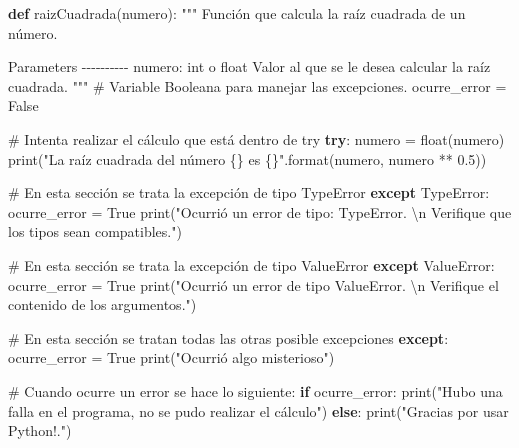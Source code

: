 \documentclass[
  spanish,
  letterpaper,
]{scrbook}
\newenvironment{Shaded}{\begin{snugshade}}{\end{snugshade}}
\newcommand{\BuiltInTok}[1]{\textcolor[rgb]{0.00,0.23,0.31}{#1}}
\newcommand{\CharTok}[1]{\textcolor[rgb]{0.13,0.47,0.30}{#1}}
\newcommand{\CommentTok}[1]{\textcolor[rgb]{0.37,0.37,0.37}{#1}}
\newcommand{\ControlFlowTok}[1]{\textcolor[rgb]{0.00,0.23,0.31}{\textbf{#1}}}
\newcommand{\FloatTok}[1]{\textcolor[rgb]{0.68,0.00,0.00}{#1}}
\newcommand{\KeywordTok}[1]{\textcolor[rgb]{0.00,0.23,0.31}{\textbf{#1}}}
\newcommand{\NormalTok}[1]{\textcolor[rgb]{0.00,0.23,0.31}{#1}}
\newcommand{\OperatorTok}[1]{\textcolor[rgb]{0.37,0.37,0.37}{#1}}
\newcommand{\PreprocessorTok}[1]{\textcolor[rgb]{0.68,0.00,0.00}{#1}}
\newcommand{\SpecialCharTok}[1]{\textcolor[rgb]{0.37,0.37,0.37}{#1}}
\newcommand{\StringTok}[1]{\textcolor[rgb]{0.13,0.47,0.30}{#1}}
\newcommand{\VariableTok}[1]{\textcolor[rgb]{0.07,0.07,0.07}{#1}}
\theoremstyle{definition}
\theoremstyle{remark}
\begin{document}
\begin{Shaded}
\begin{Highlighting}[]
\KeywordTok{def}\NormalTok{ raizCuadrada(numero):}
    \CommentTok{"""}
\CommentTok{    Función que calcula la raíz cuadrada de un número.}

\CommentTok{    Parameters}
\CommentTok{    {-}{-}{-}{-}{-}{-}{-}{-}{-}{-}}
\CommentTok{    numero: int o float}
\CommentTok{        Valor al que se le desea calcular la raíz cuadrada.}
\CommentTok{    }
\CommentTok{    """}
    \CommentTok{\# Variable Booleana para manejar las excepciones.}
\NormalTok{    ocurre\_error }\OperatorTok{=} \VariableTok{False}
    
    \CommentTok{\# Intenta realizar el cálculo que está dentro de try}
    \ControlFlowTok{try}\NormalTok{:}
\NormalTok{        numero }\OperatorTok{=} \BuiltInTok{float}\NormalTok{(numero)}
        \BuiltInTok{print}\NormalTok{(}\StringTok{"La raíz cuadrada del número }\SpecialCharTok{\{\}}\StringTok{ es }\SpecialCharTok{\{\}}\StringTok{"}\NormalTok{.}\BuiltInTok{format}\NormalTok{(numero, numero }\OperatorTok{**} \FloatTok{0.5}\NormalTok{))}

    \CommentTok{\# En esta sección se trata la excepción de tipo TypeError}
    \ControlFlowTok{except} \PreprocessorTok{TypeError}\NormalTok{:}
\NormalTok{        ocurre\_error }\OperatorTok{=} \VariableTok{True}
        \BuiltInTok{print}\NormalTok{(}\StringTok{"Ocurrió un error de tipo: TypeError. }\CharTok{\textbackslash{}n}\StringTok{ Verifique que los tipos sean compatibles."}\NormalTok{)}

    \CommentTok{\# En esta sección se trata la excepción de tipo ValueError}
    \ControlFlowTok{except} \PreprocessorTok{ValueError}\NormalTok{:}
\NormalTok{        ocurre\_error }\OperatorTok{=} \VariableTok{True}
        \BuiltInTok{print}\NormalTok{(}\StringTok{"Ocurrió un error de tipo ValueError. }\CharTok{\textbackslash{}n}\StringTok{ Verifique el contenido de los argumentos."}\NormalTok{)}

    \CommentTok{\# En esta sección se tratan todas las otras posible excepciones}
    \ControlFlowTok{except}\NormalTok{:}
\NormalTok{        ocurre\_error }\OperatorTok{=} \VariableTok{True}
        \BuiltInTok{print}\NormalTok{(}\StringTok{"Ocurrió algo misterioso"}\NormalTok{)}
        
    \CommentTok{\# Cuando ocurre un error se hace lo siguiente:}
    \ControlFlowTok{if}\NormalTok{ ocurre\_error:}
        \BuiltInTok{print}\NormalTok{(}\StringTok{"Hubo una falla en el programa, no se pudo realizar el cálculo"}\NormalTok{)}
    \ControlFlowTok{else}\NormalTok{:}
        \BuiltInTok{print}\NormalTok{(}\StringTok{"Gracias por usar Python!."}\NormalTok{)}
\end{Highlighting}
\end{Shaded}
\end{document}
